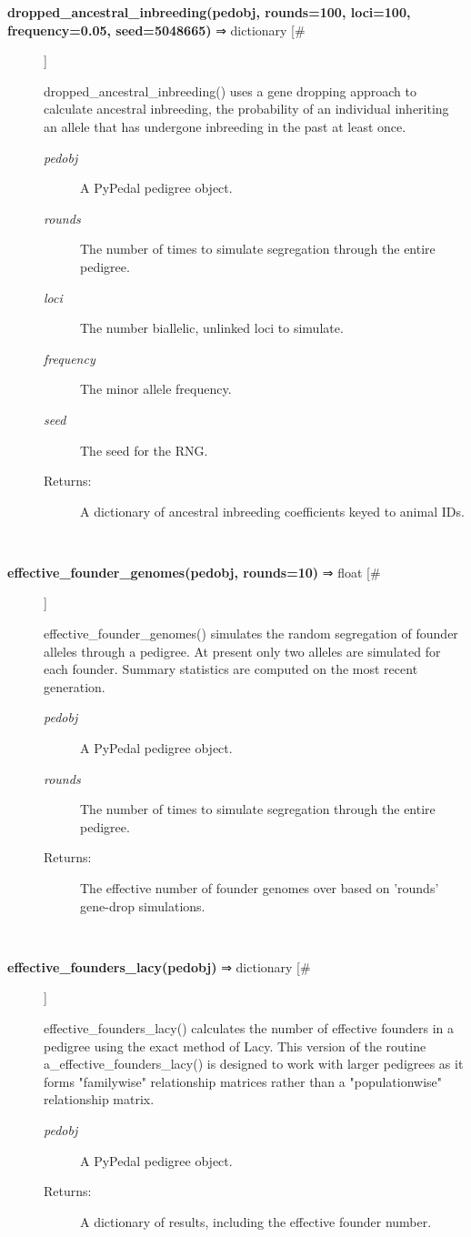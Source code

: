 \begin{description}
\item[\textbf{dropped\_ancestral\_inbreeding(pedobj, rounds=100, loci=100, frequency=0.05, seed=5048665)} ⇒ dictionary [\#]
]
\par dropped\_ancestral\_inbreeding() uses a gene dropping approach to calculate
ancestral inbreeding, the probability of an individual inheriting an allele
that has undergone inbreeding in the past at least once.
\begin{description}
\item[\textit{pedobj}
]
A PyPedal pedigree object.
\item[\textit{rounds}
]
The number of times to simulate segregation through the entire pedigree.
\item[\textit{loci}
]
The number biallelic, unlinked loci to simulate.
\item[\textit{frequency}
]
The minor allele frequency.
\item[\textit{seed}
]
The seed for the RNG.
\item[Returns:
]
A dictionary of ancestral inbreeding coefficients keyed to animal IDs.
\end{description}\\

\item[\textbf{effective\_founder\_genomes(pedobj, rounds=10)} ⇒ float [\#]
]
\par effective\_founder\_genomes() simulates the random segregation of founder alleles through a pedigree.
At present only two alleles are simulated for each founder.  Summary statistics are
computed on the most recent generation.
\begin{description}
\item[\textit{pedobj}
]
A PyPedal pedigree object.
\item[\textit{rounds}
]
The number of times to simulate segregation through the entire pedigree.
\item[Returns:
]
The effective number of founder genomes over based on 'rounds' gene-drop simulations.
\end{description}\\

\item[\textbf{effective\_founders\_lacy(pedobj)} ⇒ dictionary [\#]
]
\par effective\_founders\_lacy() calculates the number of effective founders in a pedigree
using the exact method of Lacy.  This version of the routine a\_effective\_founders\_lacy()
is designed to work with larger pedigrees as it forms "familywise" relationship matrices
rather than a "populationwise" relationship matrix.
\begin{description}
\item[\textit{pedobj}
]
A PyPedal pedigree object.
\item[Returns:
]
A dictionary of results, including the effective founder number.
\end{description}\\


\end{description}
